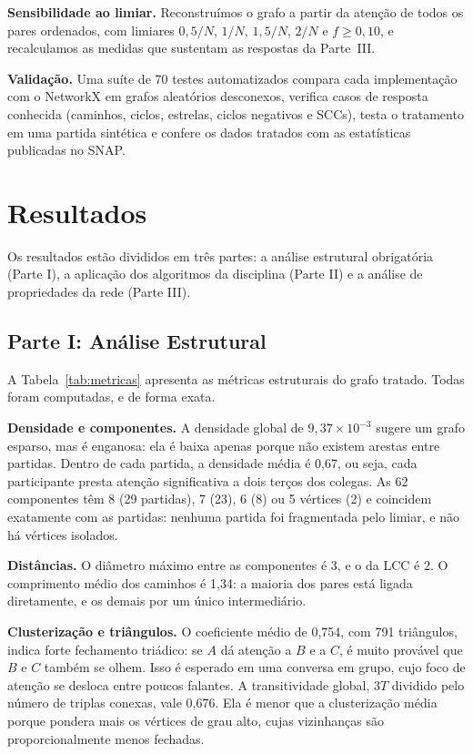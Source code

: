 \documentclass[sigconf]{webmedia}
\begin{document}
\textbf{Sensibilidade ao limiar.} Reconstruímos o grafo a partir da atenção de todos os pares ordenados, com limiares $0{,}5/N$, $1/N$, $1{,}5/N$, $2/N$ e $f \geq 0{,}10$, e recalculamos as medidas que sustentam as respostas da Parte~III.

\textbf{Validação.} Uma suíte de 70 testes automatizados compara cada implementação com o NetworkX em grafos aleatórios desconexos, verifica casos de resposta conhecida (caminhos, ciclos, estrelas, ciclos negativos e SCCs), testa o tratamento em uma partida sintética e confere os dados tratados com as estatísticas publicadas no SNAP.

\section{Resultados}
\label{sec:resultados}
Os resultados estão divididos em três partes: a análise estrutural obrigatória (Parte I), a aplicação dos algoritmos da disciplina (Parte II) e a análise de propriedades da rede (Parte III).

\subsection{Parte I: Análise Estrutural}
A Tabela~\ref{tab:metricas} apresenta as métricas estruturais do grafo tratado. Todas foram computadas, e de forma exata.

\begin{table}[t]
  \caption{Métricas estruturais do grafo tratado e método de cálculo. Todas foram computadas; nenhuma por amostragem.}
  \label{tab:metricas}
  
\end{table}

\textbf{Densidade e componentes.} A densidade global de $9{,}37 \times 10^{-3}$ sugere um grafo esparso, mas é enganosa: ela é baixa apenas porque não existem arestas entre partidas. Dentro de cada partida, a densidade média é 0,67, ou seja, cada participante presta atenção significativa a dois terços dos colegas. As 62 componentes têm 8 (29 partidas), 7 (23), 6 (8) ou 5 vértices (2) e coincidem exatamente com as partidas: nenhuma partida foi fragmentada pelo limiar, e não há vértices isolados.

\textbf{Distâncias.} O diâmetro máximo entre as componentes é 3, e o da LCC é 2. O comprimento médio dos caminhos é 1,34: a maioria dos pares está ligada diretamente, e os demais por um único intermediário.

\textbf{Clusterização e triângulos.} O coeficiente médio de 0,754, com 791 triângulos, indica forte fechamento triádico: se $A$ dá atenção a $B$ e a $C$, é muito provável que $B$ e $C$ também se olhem. Isso é esperado em uma conversa em grupo, cujo foco de atenção se desloca entre poucos falantes. A transitividade global, $3T$ dividido pelo número de triplas conexas, vale 0,676. Ela é menor que a clusterização média porque pondera mais os vértices de grau alto, cujas vizinhanças são proporcionalmente menos fechadas.
\end{document}
